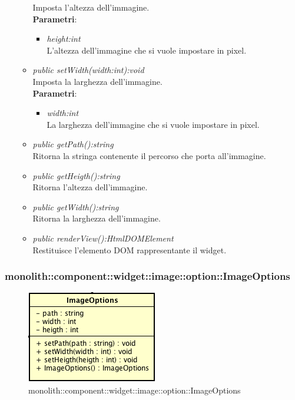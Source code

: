 \begin{itemize}
\begin{itemize}
	Imposta l'altezza dell'immagine.
		\\ \textbf{Parametri}: \begin{itemize}
		\item \textit{height:int}\\
		L'altezza dell'immagine che si vuole impostare in pixel.
		\end{itemize} 
	\item \textit{public setWidth(width:int):void}\\
	Imposta la larghezza dell'immagine.
		\\ \textbf{Parametri}: \begin{itemize}
		\item \textit{width:int}\\
		La larghezza dell'immagine che si vuole impostare in pixel.
		\end{itemize} 
	\item \textit{public getPath():string}\\
	Ritorna la stringa contenente il percorso che porta all'immagine.
	\item \textit{public getHeigth():string}\\
	Ritorna l'altezza dell'immagine.
	\item \textit{public getWidth():string}\\
	Ritorna la larghezza dell'immagine.
	\item \textit{public renderView():HtmlDOMElement}\\
	Restituisce l'elemento DOM rappresentante il widget.
	\end{itemize}
\end{itemize}

\subsubsection{monolith::component::widget::image::option::ImageOptions}

\label{monolith::component::widget::image::option::ImageOptions}
\begin{figure}[H]
	\centering
	\includegraphics[scale=0.5]{Sezioni/SottosezioniST/img/ImageOptions.png}
	\caption{monolith::component::widget::image::option::ImageOptions}
\end{figure}


